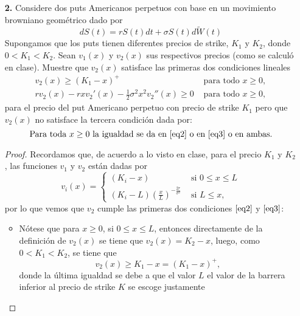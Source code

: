 \documentclass[letterpaper]{article}
\newcommand{\1}{\mathds{1}}
\theoremstyle{definition}
\theoremstyle{definition}
\theoremstyle{definition}
\theoremstyle{definition}
\theoremstyle{definition}
\begin{document}
\begin{itemize}
\begin{proof}
\begin{align*}
        &\iff L\sigma^2= 2rK-2rL\\
        &\iff L(\sigma^2+2r)= 2rK\\
        &\iff L= \frac{2r}{2r+\sigma^2}K\\
      \end{align*}
      por lo que el \textit{smooth pasting}, se logra siempre que 
      \[
      L_*=  \frac{2r}{2r+\sigma^2}K.
      \]
     \end{proof}
    \item[\textbf{2.}] Considere dos puts Americanos perpetuos con base en un movimiento 
    browniano geométrico dado por 
    \[
    dS(t)=rS(t)dt+\sigma S(t)d\widetilde{W}(t)    
    \]
    Supongamos que los puts tienen diferentes precios de strike, $K_1$ y $K_2$, donde $0<K_1<K_2$. Sean 
    $v_1(x)$ y $v_2(x)$ sus respectivos precios (como se calculó en clase). Muestre que $v_2(x)$ satisface 
    las primeras dos condiciones lineales 
    \begin{eqnarray}
        v_2(x)\geq (K_1-x)^{+} & \text{ para todo } x\geq 0,\label{eq2}\\ 
        rv_2(x)-rxv_2'(x)-\frac{1}{2}\sigma^2x^2v_2''(x)\geq 0 & \text{ para todo } x\geq0\label{eq3}, 
    \end{eqnarray}   
    para el precio del put Americano perpetuo con precio de strike $K_1$ pero que $v_2(x)$ no satisface la 
    tercera condición dada por: 
    \[
    \text{Para toda } x\geq0 \text{ la igualdad se da en \eqref{eq2} o en \eqref{eq3} o en ambas.}    
    \]  
    \begin{proof} 
    Recordamos que, de acuerdo a lo visto en clase, para el precio $K_1$ y $K_2$, las funciones $v_1$ y $v_2$ están 
    dadas por
    \[v_i(x)= 
    \begin{cases}
        (K_i-x) & \text{ si } 0\leq x \leq L\\
        (K_i-L)\left(\frac{x}{L}\right)^{-\frac{2r}{\sigma^2}} & \text{ si } L\leq x,
    \end{cases}
    \] 
    por lo que vemos que $v_2$ cumple las primeras dos condiciones $\eqref{eq2}$ y $\eqref{eq3}$:
    \begin{itemize}
        \item Nótese que para $x\geq0$, si $0\leq x\leq L$, entonces directamente de la definición 
        de $v_2(x)$ se tiene que $v_2(x)=K_2-x$, luego, como $0<K_1<K_2$, se tiene que 
        \[
        v_2(x)\geq K_1-x=(K_1-x)^{+},    
        \]
        donde la última igualdad se debe a que el valor $L$ el valor de la barrera inferior al precio de strike $K$ se escoge justamente 

\end{itemize}
\end{proof}
\end{itemize}
\end{document}
